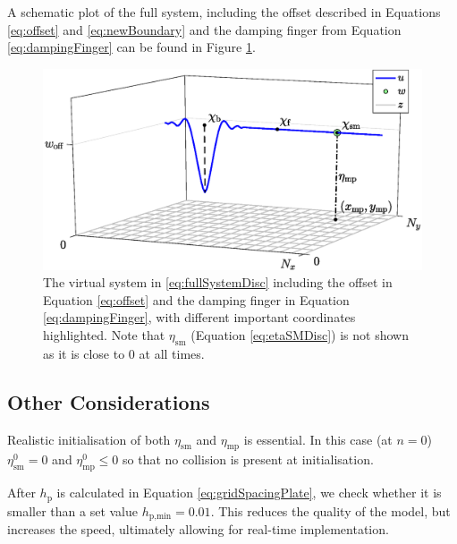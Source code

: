 \documentclass[dvipsnames, pdftex]{article}
\begin{document}
A schematic plot of the full system, including the offset described in Equations \eqref{eq:offset} and \eqref{eq:newBoundary} and the damping finger from Equation \eqref{eq:dampingFinger} can be found in Figure \ref{fig:trombaSystem}.

\begin{figure}[t]
  \centering
  \includegraphics[width=1.0\columnwidth]{trombaSystem.eps}
  \caption{The virtual system in \eqref{eq:fullSystemDisc} including the offset in Equation \eqref{eq:offset} and the damping finger in Equation \eqref{eq:dampingFinger}, with different important coordinates highlighted. Note that $\eta_\text{sm}$ (Equation \eqref{eq:etaSMDisc}) is not shown as it is close to 0 at all times.}
  \label{fig:trombaSystem}
\end{figure}


\subsection{Other Considerations}
Realistic initialisation of both $\eta_\text{sm}$ and $\eta_\text{mp}$ is essential. In this case (at $n=0$) $\eta_\text{sm}^0 = 0$ and $\eta_\text{mp}^0 \leq 0$ so that no collision is present at initialisation.%

After $h_\text{p}$ is calculated in Equation \eqref{eq:gridSpacingPlate}, we check whether it is smaller than a set value $h_{\text{p},\text{min}} = 0.01$. This reduces the quality of the model, but increases the speed, ultimately allowing for real-time implementation.
\end{document}
